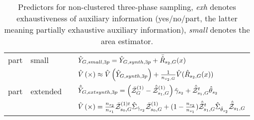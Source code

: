 \begin{table}
\begin{tabular}{ l l r l}
     part 	&  small 	& \cite[eq. 22a]{hill2017} & $\hat{Y}_{G,small,3p} = \hat{Y}_{G,synth,3p} + \bar{\hat{R}}_{s_2,G}(x)$\\
            &      	& \cite[eq. 23a]{hill2017} & $\hat{V}\left(\times\right) \approx \hat{V}\left(\hat{Y}_{G,synth,3p}\right) + \frac{1}{n_{s_2,G}}\hat{V}(\hat{R}_{s_2,G}(x))$ \\
\lightrule

	 part 	&  extended 	& \analogy{} & $\hat{\tilde{Y}}_{G,ext synth,3p} = \left( \bar{\mathcal{Z}}_{G}^{(1)}- \hat{\bar{\mathcal{Z}}}_{s_1,G}^{(1)}\right) \hat{\gamma}_{s_2} + \hat{\bar{\mathcal{Z}}}^t_{s_1,G}\hat{\theta}_{s_2}$\\
	   	&    	&    \analogy{} & $\hat{V}\left(\times\right) = \frac{n_{s_2}}{n_{s_1}} \bar{\mathcal{Z}}^{(1)t}_{s_0,G} \hat{\Sigma}_{ \hat{\gamma}_{s_2}} \bar{\mathcal{Z}}^{(1)}_{s_0,G} + (1-\frac{n_{s_2}}{n_{s_1}})\hat{\bar{\mathcal{Z}}}^{t}_{s_1,G} \hat{\Sigma}_{ \hat{\theta}_{s_2}} \hat{\bar{\mathcal{Z}}}_{s_1,G} $\\

\end{tabular}
\caption{Predictors for non-clustered three-phase sampling, 
    \emph{exh} denotes exhaustiveness of auxiliary information (yes/no/part, the
    latter meaning partially exhaustive auxiliary information),
    \emph{small} denotes the area estimator. \label{tab:unclustered3}
}
\end{table}


